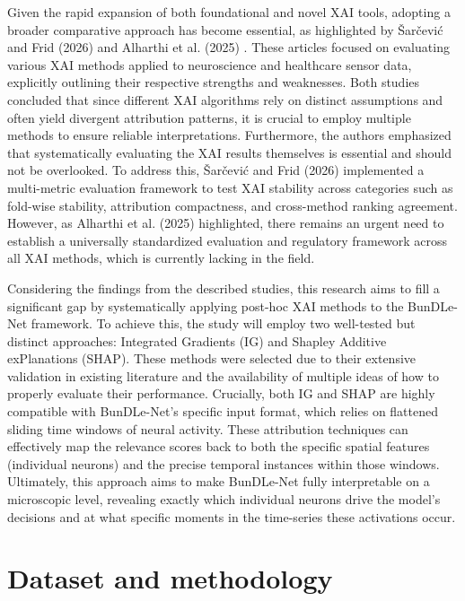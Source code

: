 \documentclass{article}
\begin{document}
Given the rapid expansion of both foundational and novel XAI tools, adopting a broader comparative approach has become essential, as highlighted by Šarčević and Frid (2026) \cite{sarcevic2026comparing} and Alharthi et al. (2025) \cite{alharthi2025explainable}. These articles focused on evaluating various XAI methods applied to neuroscience and healthcare sensor data, explicitly outlining their respective strengths and weaknesses. Both studies concluded that since different XAI algorithms rely on distinct assumptions and often yield divergent attribution patterns, it is crucial to employ multiple methods to ensure reliable interpretations. Furthermore, the authors emphasized that systematically evaluating the XAI results themselves is essential and should not be overlooked. To address this, Šarčević and Frid (2026) \cite{sarcevic2026comparing} implemented a multi-metric evaluation framework to test XAI stability across categories such as fold-wise stability, attribution compactness, and cross-method ranking agreement. However, as Alharthi et al. (2025) \cite{alharthi2025explainable} highlighted, there remains an urgent need to establish a universally standardized evaluation and regulatory framework across all XAI methods, which is currently lacking in the field. 

Considering the findings from the described studies, this research aims to fill a significant gap by systematically applying post-hoc XAI methods to the BunDLe-Net framework. To achieve this, the study will employ two well-tested but distinct approaches: Integrated Gradients (IG) and Shapley Additive exPlanations (SHAP). These methods were selected due to their extensive validation in existing literature and the availability of multiple ideas of how to properly evaluate their performance. Crucially, both IG and SHAP are highly compatible with BunDLe-Net's specific input format, which relies on flattened sliding time windows of neural activity. These attribution techniques can effectively map the relevance scores back to both the specific spatial features (individual neurons) and the precise temporal instances within those windows. Ultimately, this approach aims to make BunDLe-Net fully interpretable on a microscopic level, revealing exactly which individual neurons drive the model's decisions and at what specific moments in the time-series these activations occur.

\section{Dataset and methodology}
\end{document}
